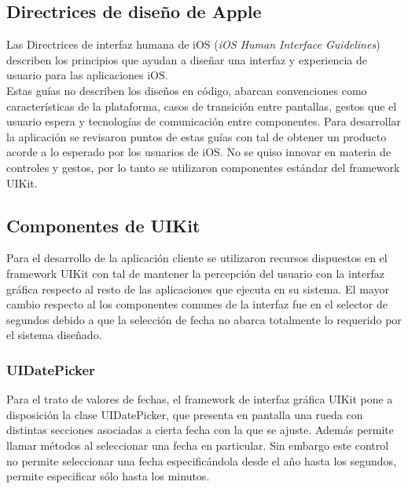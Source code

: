   \subsection{Directrices de diseño de Apple}

Las Directrices de interfaz humana de iOS (\textit{iOS Human Interface Guidelines}) describen los principios que ayudan a diseñar una interfaz y experiencia de usuario para las aplicaciones iOS.\\

Estas guías no describen los diseños en código, abarcan convenciones como características de la plataforma, casos de transición entre pantallas, gestos que el usuario espera y tecnologías de comunicación entre componentes.
Para desarrollar la aplicación se revisaron puntos de estas guías con tal de obtener un producto acorde a lo esperado por los usuarios de iOS. No se quiso innovar en materia de controles y gestos, por lo tanto se utilizaron componentes estándar del framework UIKit.
	
	\subsection{Componentes de UIKit}
	Para el desarrollo de la aplicación cliente se utilizaron recursos dispuestos en el framework UIKit con tal de mantener la percepción del usuario con la interfaz gráfica respecto al resto de las aplicaciones que ejecuta en su sistema. El mayor cambio respecto al los componentes comunes de la interfaz fue en el selector de segundos debido a que la selección de fecha no abarca totalmente lo requerido por el sistema diseñado.
	
		\subsubsection{UIDatePicker}
		\label{subsec:datepicker}
Para el trato de valores de fechas, el framework de interfaz gráfica UIKit pone a disposición la clase UIDatePicker, que presenta en pantalla una rueda con distintas secciones asociadas a cierta fecha con la que se ajuste. Además permite llamar métodos al seleccionar una fecha en particular. Sin embargo este control no permite seleccionar una fecha especificándola desde el año hasta los segundos, permite especificar sólo hasta los minutos. \\

